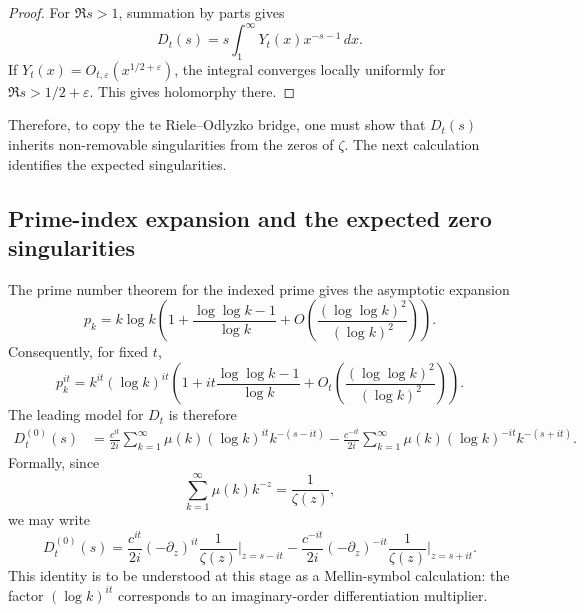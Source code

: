 \documentclass[11pt]{amsart}
\numberwithin{equation}{section}
\theoremstyle{plain}
\theoremstyle{definition}
\theoremstyle{remark}
\begin{document}
\begin{proof}
For \(\Re s>1\), summation by parts gives
\begin{equation}
D_t(s)=s\int_1^\infty Y_t(x)x^{-s-1}\,dx.
\label{eq:Dt_abel_integral}
\end{equation}
If \(Y_t(x)=O_{t,\varepsilon}(x^{1/2+\varepsilon})\), the integral converges locally uniformly for \(\Re s>1/2+\varepsilon\).  This gives holomorphy there.
\end{proof}

Therefore, to copy the te Riele--Odlyzko bridge, one must show that \(D_t(s)\) inherits non-removable singularities from the zeros of \(\zeta\).  The next calculation identifies the expected singularities.

\subsection{Prime-index expansion and the expected zero singularities}
\label{subsec:Yt_prime_index_expansion}

The prime number theorem for the indexed prime gives the asymptotic expansion
\begin{equation}
p_k=k\log k\left(1+\frac{\log\log k-1}{\log k}
+O\left(\frac{(\log\log k)^2}{(\log k)^2}\right)\right).
\label{eq:indexed_prime_expansion}
\end{equation}
Consequently, for fixed \(t\),
\begin{equation}
p_k^{it}=k^{it}(\log k)^{it}
\left(1+it\frac{\log\log k-1}{\log k}
+O_t\left(\frac{(\log\log k)^2}{(\log k)^2}\right)\right).
\label{eq:pkit_expansion}
\end{equation}
The leading model for \(D_t\) is therefore
\begin{align}
D_t^{(0)}(s)
&=\frac{c^{it}}{2i}\sum_{k=1}^{\infty}\mu(k)(\log k)^{it}k^{-(s-it)}
 -\frac{c^{-it}}{2i}\sum_{k=1}^{\infty}\mu(k)(\log k)^{-it}k^{-(s+it)}.
\label{eq:Dt_leading_model}
\end{align}
Formally, since
\begin{equation}
\sum_{k=1}^{\infty}\mu(k)k^{-z}=\frac1{\zeta(z)},
\label{eq:mobius_zeta_inverse_for_Dt}
\end{equation}
we may write
\begin{equation}
D_t^{(0)}(s)
=\frac{c^{it}}{2i}
(-\partial_z)^{it}\frac1{\zeta(z)}\bigg|_{z=s-it}
-\frac{c^{-it}}{2i}
(-\partial_z)^{-it}\frac1{\zeta(z)}\bigg|_{z=s+it}.
\label{eq:Dt_fractional_derivative_model}
\end{equation}
This identity is to be understood at this stage as a Mellin-symbol calculation: the factor \((\log k)^{it}\) corresponds to an imaginary-order differentiation multiplier.
\end{document}
